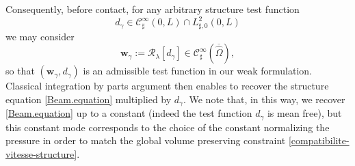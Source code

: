 \documentclass[10pt]{amsart}
\let\mathcal\mathscr
\theoremstyle{remark}
\theoremstyle{definition}
\newcommand{\wg}{\boldsymbol{w}}
\begin{document}
Consequently, before contact, for any arbitrary structure test function
\[
d_{\gamma} \in \mathcal{C}^{\infty}_{\sharp}(0,L) \cap L^2_{\sharp,0}(0,L)
\]
we may consider
\[
\wg_{\gamma} := \mathcal R_{{\lambda}}[d_{\gamma}] \in \mathcal{C}^{\infty}_{\sharp}(\overline{\hat{\Omega}}),
\]
so that $(\wg_{\gamma},d_{\gamma})$ is an admissible test function in our weak formulation. Classical integration by parts argument then enables to recover the structure equation \eqref{Beam.equation} multiplied by $d_{\gamma}$. We note that, in this way, we recover \eqref{Beam.equation} up to a constant (indeed the test function $d_{\gamma}$ is mean free), but this constant mode corresponds to the choice of the constant normalizing the pressure in order to match the global volume preserving constraint
\eqref{compatibilite-vitesse-structure}.
\end{document}
